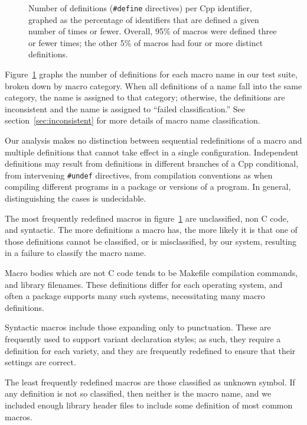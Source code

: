 \documentclass[10pt]{article}
\begin{document}
\begin{figure}
\centerline{}
\caption{Number of definitions ({\tt \#define} directives) per Cpp
  identifier, graphed as the percentage of identifiers that are defined a
  given number of times or fewer.  Overall, 95\% of macros were defined
  three or fewer times; the other 5\% of macros had four or more distinct
  definitions.}
\label{fig:freq-def-cat}
\end{figure}

Figure~\ref{fig:freq-def-cat} graphs the number of definitions for each
macro name in our test suite, broken down by macro category.  When all
definitions of a name fall into the same category, the name is assigned to
that category; otherwise, the definitions are inconsistent and the name is
assigned to ``failed classification.''  See section~\ref{sec:inconsistent}
for more details of macro name classification.

Our analysis makes no distinction between sequential redefinitions of a
macro and multiple definitions that cannot take effect in a single
configuration.  Independent definitions may result from definitions in
different branches of a Cpp conditional, from intervening {\tt \#undef}
directives, from compilation conventions as when compiling different
programs in a package or versions of a program.  In general, distinguishing
the cases is undecidable.

The most frequently redefined macros in figure~\ref{fig:freq-def-cat} are
unclassified, non C code, and syntactic.  The more definitions a macro has,
the more likely it is that one of those definitions cannot be classified,
or is misclassified, by our system, resulting in a failure to classify the
macro name.

Macro bodies which are not C code tends to be Makefile compilation
commands, and library filenames.  These definitions differ for each
operating system, and often a package supports many such systems,
necessitating many macro definitions.  

Syntactic macros include those expanding only to punctuation.  These are
frequently used to support variant declaration styles; as such, they
require a definition for each variety, and they are frequently redefined to
ensure that their settings are correct.

The least frequently redefined macros are those classified as unknown
symbol.  If any definition is not so classified, then neither is the
macro name, and we included enough library header files to include some
definition of most common macros.
\end{document}
